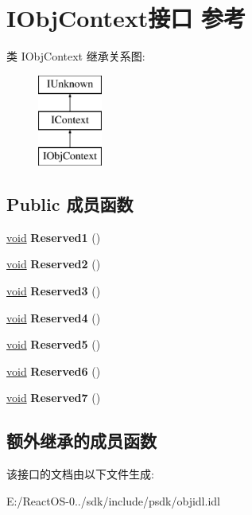 \hypertarget{interface_i_obj_context}{}\section{I\+Obj\+Context接口 参考}
\label{interface_i_obj_context}
类 I\+Obj\+Context 继承关系图\+:\begin{figure}[H]
\begin{center}
\leavevmode
\includegraphics[height=3.000000cm]{interface_i_obj_context}
\end{center}
\end{figure}
\subsection*{Public 成员函数}
\begin{DoxyCompactItemize}
\item 
\mbox{\label{interface_i_obj_context_ab2e0a9aa03948c56e651f2eab26343bb}} 
\hyperlink{interfacevoid}{void} {\bfseries Reserved1} ()
\item 
\mbox{\label{interface_i_obj_context_ad9d24a89b4bc6e2beecd834991992d92}} 
\hyperlink{interfacevoid}{void} {\bfseries Reserved2} ()
\item 
\mbox{\label{interface_i_obj_context_a75af815318207b5be80d9c3e4419d24a}} 
\hyperlink{interfacevoid}{void} {\bfseries Reserved3} ()
\item 
\mbox{\label{interface_i_obj_context_a47373646f544c1f508fd3e8ecdf36247}} 
\hyperlink{interfacevoid}{void} {\bfseries Reserved4} ()
\item 
\mbox{\label{interface_i_obj_context_a59f4aba413eca3dd7f3c44618a93d19f}} 
\hyperlink{interfacevoid}{void} {\bfseries Reserved5} ()
\item 
\mbox{\label{interface_i_obj_context_a7f1ccce96ecef0d5bed51d7eaa5c73f3}} 
\hyperlink{interfacevoid}{void} {\bfseries Reserved6} ()
\item 
\mbox{\label{interface_i_obj_context_af76aa181f146890df40c149442b34bd6}} 
\hyperlink{interfacevoid}{void} {\bfseries Reserved7} ()
\end{DoxyCompactItemize}
\subsection*{额外继承的成员函数}


该接口的文档由以下文件生成\+:\begin{DoxyCompactItemize}
\item 
E\+:/\+React\+O\+S-\/0../sdk/include/psdk/objidl.\+idl\end{DoxyCompactItemize}
